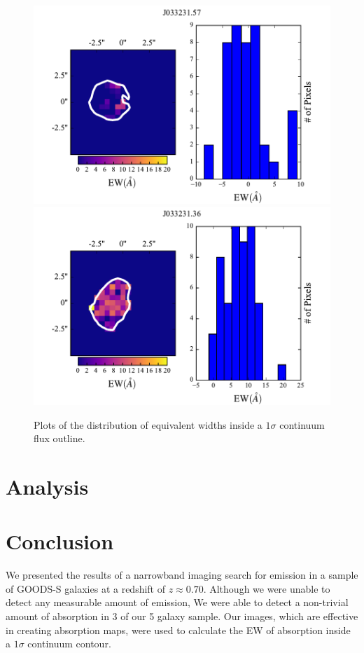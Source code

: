 \documentclass[twocolumn]{aastex6}
\begin{document}
\begin{figure}[ht!]
\includegraphics[scale=.58]{../Figures/J57EW.pdf}
\includegraphics[scale=.58]{../Figures/J36EW.pdf}
\caption{ Plots of the distribution of equivalent widths inside a $1\sigma$ continuum flux outline. }
\label{fig:ew_images}
\end{figure}

\section{Analysis}
\section{Conclusion}
We presented the results of a narrowband imaging search for  emission in a sample of GOODS-S galaxies at a redshift of $z \approx 0.70$. Although we were unable to detect any measurable amount of  emission, We were able to detect a non-trivial amount of  absorption in 3 of our 5 galaxy sample. Our images, which are effective in creating absorption maps, were used to calculate the EW of absorption inside a $1\sigma$ continuum contour. 

\end{document}
